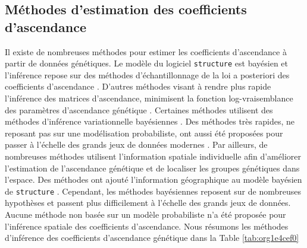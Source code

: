 \documentclass[12pt,a4paper,twoside]{ugathesis}
\begin{document}
\subsection{Méthodes d'estimation des coefficients d'ascendance}
\label{sec:org96708bd}

Il existe de nombreuses méthodes pour estimer les coefficients d'ascendance à
partir de données génétiques. Le modèle du logiciel \texttt{structure} est bayésien et
l'inférence repose sur des méthodes d'échantillonnage de la loi a posteriori des
coefficients d'ascendance \citep{Pritchard2000}. D'autres méthodes visant à rendre
plus rapide l'inférence des matrices d'ascendance, minimisent la fonction
log-vraisemblance des paramètres d'ascendance génétique
\citep{Tang_2005,alexander2009admixture}. Certaines méthodes utilisent des
méthodes d'inférence variationnelle bayésiennes \citep{Raj_2014}. Des méthodes
très rapides, ne reposant pas sur une modélisation probabiliste, ont aussi été
proposées pour passer à l'échelle des grands jeux de données modernes
\citep{Frichot_2014,Popescu_2014}. Par ailleurs, de nombreuses méthodes utilisent
l'information spatiale individuelle afin d'améliorer l'estimation de
l'ascendance génétique et de localiser les groupes génétiques dans l'espace.
Des méthodes ont ajouté l'information géographique au modèle bayésien de
\texttt{structure} \citep{CHEN_2007,Corander2008,GUEDJ_2011}. Cependant, les méthodes
bayésiennes reposent sur de nombreuses hypothèses et passent plus difficilement
à l'échelle des grands jeux de données. Aucune méthode non basée sur un modèle
probabiliste n'a été proposée pour l'inférence spatiale des coefficients
d'ascendance. Nous résumons les méthodes d'inférence des coefficients
d'ascendance génétique dans la Table \ref{tab:org1e4cef0}
\end{document}
